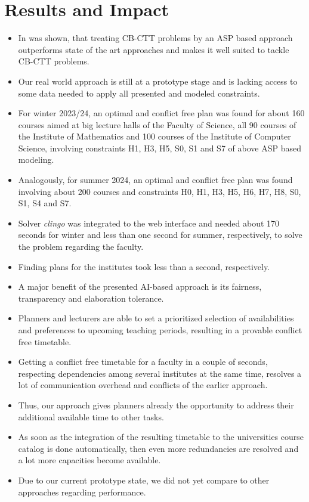 \documentclass{easychair}
\newcommand{\CBCTT}{CB-CTT}
\newcommand{\ASP}{ASP}
\newcommand{\clingo}{\textit{clingo}}
\begin{document}
\section{Results and Impact}
\label{sec:impact}
\begin{itemize}%
  \item%
  In \cite{bainkaokscsotawa18a} was shown, that treating \CBCTT{} problems by an \ASP{} based approach outperforms state of the art approaches and makes it well suited to tackle \CBCTT{} problems. 
  \item%
  Our real world approach is still at a prototype stage and is lacking access to some data needed to apply all presented and modeled constraints. 
  \item%
  For winter 2023/24, an optimal and conflict free plan was found for about 160 courses aimed at big lecture halls of the Faculty of Science, all 90 courses of the Institute of Mathematics and 100 courses of the Institute of Computer Science, involving constraints H1, H3, H5, S0, S1 and S7 of above \ASP{} based modeling. 
  \item%
  Analogously, for summer 2024, an optimal and conflict free plan was found involving about 200 courses and constraints H0, H1, H3, H5, H6, H7, H8, S0, S1, S4 and S7.  
  \item%
  Solver \clingo{} was integrated to the web interface and needed about 170 seconds for winter and less than one second for summer, respectively, to solve the problem regarding the faculty. 
  \item%
  Finding plans for the institutes took less than a second, respectively. 
  \item%
  A major benefit of the presented AI-based approach is its fairness, transparency and elaboration tolerance. 
  \item%
  Planners and lecturers are able to set a prioritized selection of availabilities and preferences to upcoming teaching periods, resulting in a provable conflict free timetable. 
  \item%
  Getting a conflict free timetable for a faculty in a couple of seconds, respecting dependencies among several institutes at the same time, resolves a lot of communication overhead and conflicts of the earlier approach. 
  \item%
  Thus, our approach gives planners already the opportunity to address their additional available time to other tasks. 
  \item%
  As soon as the integration of the resulting timetable to the universities course catalog is done automatically, then even more redundancies are resolved and a lot more capacities become available. 
  \item%
  Due to our current prototype state, we did not yet compare to other approaches\cite{feutrier23a} regarding performance. 
\end{itemize}%
\end{document}
